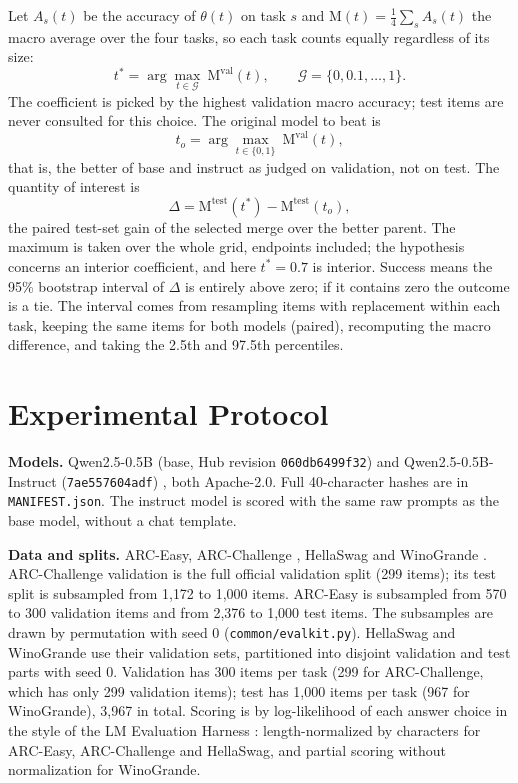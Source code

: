 \documentclass[conference]{IEEEtran}
\begin{document}
Let $A_s(t)$ be the accuracy of $\theta(t)$ on task $s$ and $\mathrm{M}(t)=\frac14\sum_{s}A_s(t)$ the macro average over the four tasks, so each task counts equally regardless of its size:
\begin{equation}
t^\ast=\arg\max_{t\in\mathcal{G}}\ \mathrm{M}^{\mathrm{val}}(t),\qquad \mathcal{G}=\{0,0.1,\dots,1\}.
\end{equation}
The coefficient is picked by the highest validation macro accuracy; test items are never consulted for this choice. The original model to beat is
\begin{equation}
t_o=\arg\max_{t\in\{0,1\}}\ \mathrm{M}^{\mathrm{val}}(t),
\end{equation}
that is, the better of base and instruct as judged on validation, not on test. The quantity of interest is
\begin{equation}
\Delta=\mathrm{M}^{\mathrm{test}}(t^\ast)-\mathrm{M}^{\mathrm{test}}(t_o),
\end{equation}
the paired test-set gain of the selected merge over the better parent. The maximum is taken over the whole grid, endpoints included; the hypothesis concerns an interior coefficient, and here $t^\ast=0.7$ is interior. Success means the 95\% bootstrap interval of $\Delta$ is entirely above zero; if it contains zero the outcome is a tie. The interval comes from resampling items with replacement within each task, keeping the same items for both models (paired), recomputing the macro difference, and taking the 2.5th and 97.5th percentiles.

\section{Experimental Protocol}
\textbf{Models.} Qwen2.5-0.5B (base, Hub revision \texttt{060db6499f32}) and Qwen2.5-0.5B-Instruct (\texttt{7ae557604adf}) \cite{qwen2024qwen25}, both Apache-2.0. Full 40-character hashes are in \texttt{MANIFEST.json}. The instruct model is scored with the same raw prompts as the base model, without a chat template.

\textbf{Data and splits.} ARC-Easy, ARC-Challenge \cite{clark2018arc}, HellaSwag \cite{zellers2019hellaswag} and WinoGrande \cite{sakaguchi2020winogrande}. ARC-Challenge validation is the full official validation split (299 items); its test split is subsampled from 1{,}172 to 1{,}000 items. ARC-Easy is subsampled from 570 to 300 validation items and from 2{,}376 to 1{,}000 test items. The subsamples are drawn by permutation with seed 0 (\texttt{common/evalkit.py}). HellaSwag and WinoGrande use their validation sets, partitioned into disjoint validation and test parts with seed 0. Validation has 300 items per task (299 for ARC-Challenge, which has only 299 validation items); test has 1{,}000 items per task (967 for WinoGrande), 3{,}967 in total. Scoring is by log-likelihood of each answer choice in the style of the LM Evaluation Harness \cite{gao2023harness}: length-normalized by characters for ARC-Easy, ARC-Challenge and HellaSwag, and partial scoring without normalization for WinoGrande.
\end{document}

